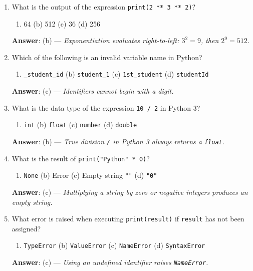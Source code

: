 \begin{enumerate}[leftmargin=1.5em]
    \item What is the output of the expression \texttt{print(2 ** 3 ** 2)}?
    \begin{enumerate}[label=(\alph*)]
        \item 64 \quad (b) 512 \quad (c) 36 \quad (d) 256
    \end{enumerate}
    \textbf{Answer}: (b) --- \textit{Exponentiation evaluates right-to-left: $3^2 = 9$, then $2^9 = 512$.}

    \item Which of the following is an invalid variable name in Python?
    \begin{enumerate}[label=(\alph*)]
        \item \texttt{\_student\_id} \quad (b) \texttt{student\_1} \quad (c) \texttt{1st\_student} \quad (d) \texttt{studentId}
    \end{enumerate}
    \textbf{Answer}: (c) --- \textit{Identifiers cannot begin with a digit.}

    \item What is the data type of the expression \texttt{10 / 2} in Python 3?
    \begin{enumerate}[label=(\alph*)]
        \item \texttt{int} \quad (b) \texttt{float} \quad (c) \texttt{number} \quad (d) \texttt{double}
    \end{enumerate}
    \textbf{Answer}: (b) --- \textit{True division \texttt{/} in Python 3 always returns a \texttt{float}.}

    \item What is the result of \texttt{print("Python" * 0)}?
    \begin{enumerate}[label=(\alph*)]
        \item \texttt{None} \quad (b) Error \quad (c) Empty string \texttt{""} \quad (d) \texttt{"0"}
    \end{enumerate}
    \textbf{Answer}: (c) --- \textit{Multiplying a string by zero or negative integers produces an empty string.}

    \item What error is raised when executing \texttt{print(result)} if \texttt{result} has not been assigned?
    \begin{enumerate}[label=(\alph*)]
        \item \texttt{TypeError} \quad (b) \texttt{ValueError} \quad (c) \texttt{NameError} \quad (d) \texttt{SyntaxError}
    \end{enumerate}
    \textbf{Answer}: (c) --- \textit{Using an undefined identifier raises \texttt{NameError}.}


\end{enumerate}
